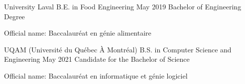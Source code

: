 

\begin{cventries}

  \cventry
    {University Laval} %
    {B.E. in Food Engineering } %
    {May 2019} %
    {Bachelor of Engineering Degree} %
    {
      \begin{cvitems} %
        \item{Official name: Baccalauréat en génie alimentaire}
      \end{cvitems}
    }

  \cventry
    {UQAM (Université du Québec À Montréal)} %
    {B.S. in Computer Science and Engineering} %
    {May 2021} %
    {Candidate for the Bachelor of Science} %
    {
      \begin{cvitems} %
        \item{Official name: Baccalauréat en informatique et génie logiciel}
      \end{cvitems}
    }

\end{cventries}
